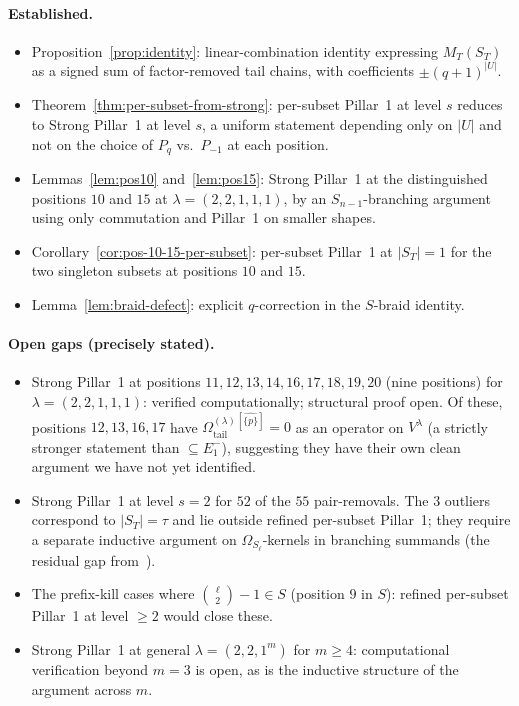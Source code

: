 \documentclass[11pt]{article}
\theoremstyle{definition}
\newcommand{\Vlam}{V^\lambda}
\newcommand{\Om}{\Omega}
\newcommand{\Omtail}{\Om^{(\lambda)}_{\mathrm{tail}}}
\newcommand{\Eminus}[1]{E^-_{#1}}
\begin{document}
\paragraph{Established.}
\begin{itemize}[topsep=0.2em,itemsep=0.1em]
\item Proposition~\ref{prop:identity}: linear-combination identity expressing
   $M_T(S_T)$ as a signed sum of factor-removed tail chains, with coefficients
   $\pm(q+1)^{|U|}$.
\item Theorem~\ref{thm:per-subset-from-strong}: per-subset Pillar~1 at level
   $s$ reduces to Strong Pillar~1 at level $s$, a uniform statement depending
   only on $|U|$ and not on the choice of $P_q$ vs.\ $P_{-1}$ at each position.
\item Lemmas~\ref{lem:pos10} and~\ref{lem:pos15}: Strong Pillar~1 at the
   distinguished positions $10$ and $15$ at $\lambda = (2,2,1,1,1)$, by an
   $S_{n-1}$-branching argument using only commutation and Pillar~1 on smaller
   shapes.
\item Corollary~\ref{cor:pos-10-15-per-subset}: per-subset Pillar~1 at
   $|S_T| = 1$ for the two singleton subsets at positions $10$ and $15$.
\item Lemma~\ref{lem:braid-defect}: explicit $q$-correction in the
   $S$-braid identity.
\end{itemize}

\paragraph{Open gaps (precisely stated).}
\begin{itemize}[topsep=0.2em,itemsep=0.1em]
\item Strong Pillar~1 at positions $11, 12, 13, 14, 16, 17, 18, 19, 20$ (nine
   positions) for $\lambda = (2,2,1,1,1)$: verified computationally; structural
   proof open. Of these, positions $12, 13, 16, 17$ have $\Omtail^{[\widehat
   {\{p\}}]} = 0$ as an operator on $\Vlam$ (a strictly stronger statement
   than $\subseteq \Eminus 1$), suggesting they have their own clean argument
   we have not yet identified.
\item Strong Pillar~1 at level $s = 2$ for $52$ of the $55$ pair-removals.
   The $3$ outliers correspond to $|S_T| = \tau$ and lie outside refined
   per-subset Pillar~1; they require a separate inductive argument on
   $\Om_{S_\ell}$-kernels in branching summands (the residual gap
   from~\cite{strong}).
\item The prefix-kill cases where $\binom{\ell}{2}-1 \in S$ (position $9$ in
   $S$): refined per-subset Pillar~1 at level $\ge 2$ would close these.
\item Strong Pillar~1 at general $\lambda = (2,2,1^m)$ for $m \ge 4$:
   computational verification beyond $m = 3$ is open, as is the inductive
   structure of the argument across $m$.
\end{itemize}
\end{document}
